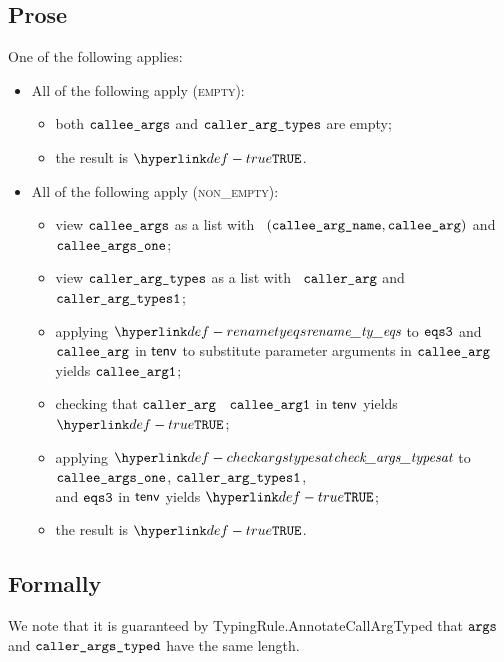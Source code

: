 \subsection{Prose}
One of the following applies:
\begin{itemize}
  \item All of the following apply (\textsc{empty}):
  \begin{itemize}
    \item both $\texttt{callee\_args}$ and $\texttt{caller\_arg\_types}$ are empty;
    \item the result is $\True$.
  \end{itemize}

  \item All of the following apply (\textsc{non\_empty}):
  \begin{itemize}
    \item view $\texttt{callee\_args}$ as a list with \head\ $(\texttt{callee\_arg\_name}, \texttt{callee\_arg})$ and \tail\ $\texttt{callee\_args\_one}$;
    \item view $\texttt{caller\_arg\_types}$ as a list with \head\ $\texttt{caller\_arg}$ and \tail\ \\
          $\texttt{caller\_arg\_types1}$;
    \item applying $\renametyeqs$ to $\texttt{eqs3}$ and $\texttt{callee\_arg}$ in $\textsf{tenv}$
          to substitute parameter arguments in $\texttt{callee\_arg}$ yields $\texttt{callee\_arg1}$\ProseOrTypeError;
    \item checking that $\texttt{caller\_arg}$ \typesatisfies\ $\texttt{callee\_arg1}$ in $\textsf{tenv}$ yields $\True$\ProseOrTypeError;
    \item applying $\checkargstypesat$ to $\texttt{callee\_args\_one}$, $\texttt{caller\_arg\_types1}$, \\
          and $\texttt{eqs3}$ in $\textsf{tenv}$
          yields $\True$\ProseOrTypeError;
    \item the result is $\True$.
  \end{itemize}
\end{itemize}

\subsection{Formally}
We note that it is guaranteed by TypingRule.AnnotateCallArgTyped
that $\texttt{args}$ and $\texttt{caller\_args\_typed}$ have the same length.

